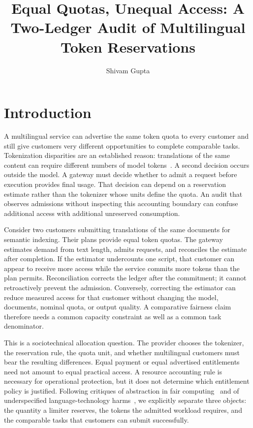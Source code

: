 \documentclass[manuscript,screen]{acmart}
\title{Equal Quotas, Unequal Access: A Two-Ledger Audit of Multilingual Token Reservations}
\author{Shivam Gupta}
\affiliation{\institution{Independent Researcher}\city{Delhi}\country{India}}
\begin{document}
\maketitle

\section{Introduction}
A multilingual service can advertise the same token quota to every customer and still give customers very different opportunities to complete comparable tasks. Tokenization disparities are an established reason: translations of the same content can require different numbers of model tokens~\cite{petrov2023,ahia-etal-2023-languages}. A second decision occurs outside the model. A gateway must decide whether to admit a request before execution provides final usage. That decision can depend on a reservation estimate rather than the tokenizer whose units define the quota. An audit that observes admissions without inspecting this accounting boundary can confuse additional access with additional unreserved consumption.

Consider two customers submitting translations of the same documents for semantic indexing. Their plans provide equal token quotas. The gateway estimates demand from text length, admits requests, and reconciles the estimate after completion. If the estimator undercounts one script, that customer can appear to receive more access while the service commits more tokens than the plan permits. Reconciliation corrects the ledger after the commitment; it cannot retroactively prevent the admission. Conversely, correcting the estimator can reduce measured access for that customer without changing the model, documents, nominal quota, or output quality. A comparative fairness claim therefore needs a common capacity constraint as well as a common task denominator.

This is a sociotechnical allocation question. The provider chooses the tokenizer, the reservation rule, the quota unit, and whether multilingual customers must bear the resulting differences. Equal payment or equal advertised entitlements need not amount to equal practical access. A resource accounting rule is necessary for operational protection, but it does not determine which entitlement policy is justified. Following critiques of abstraction in fair computing~\cite{selbst2019} and of underspecified language-technology harms~\cite{blodgett-etal-2020-language}, we explicitly separate three objects: the quantity a limiter reserves, the tokens the admitted workload requires, and the comparable tasks that customers can submit successfully.
\end{document}
